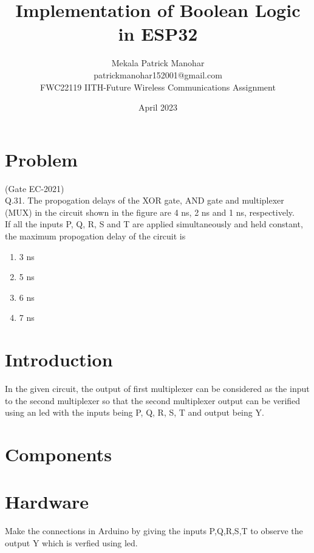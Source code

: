 \documentclass{article}
\title{Implementation of Boolean Logic in ESP32}
\date{April 2023}
\author{Mekala Patrick Manohar\\ patrickmanohar152001@gmail.com\\ FWC22119 IITH-Future Wireless Communications Assignment}
\begin{document}
\maketitle
	\tableofcontents

\section{Problem} 
		(Gate EC-2021)\\
Q.31. The propogation delays of the XOR gate, AND gate and multiplexer (MUX) in the circuit shown in the figure are 4 ns, 2 ns and 1 ns, respectively.\\

If all the inputs P, Q, R, S and T are applied simultaneously and held constant, the maximum propogation delay of the circuit is
\begin{enumerate}
	\item 3 ns \item 5 ns \item 6 ns \item 7 ns
\end{enumerate}
\section{Introduction}
		In the given circuit, the output of first multiplexer can be considered as the input to the second multiplexer so that the second multiplexer output can be verified using an led with the inputs being P, Q, R, S, T and output being Y.
\section{Components}
		
\section{Hardware}
		Make the connections in Arduino by giving the inputs P,Q,R,S,T to observe the output Y which is verfied using led.
\end{document}
